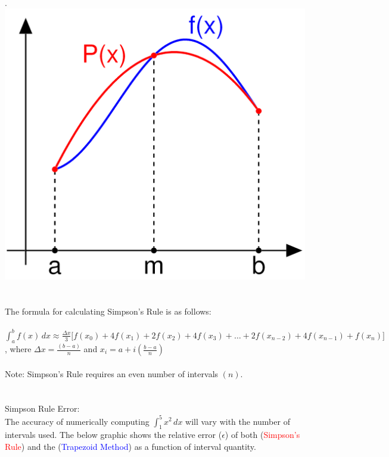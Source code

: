 \documentclass{report}
\begin{document}
\begin{enumerate}
\\. \hspace{30 mm} \includegraphics[scale=.10]{simpson.png}
\\
\\
\\
The formula for calculating Simpson's Rule is as follows:
\\
\\ $\displaystyle \int^b_a f(x)\,dx  \approx  \frac{\Delta x}{3}\Big[f(x_{0})+4f(x_1)+2f(x_2)+4f(x_3)+\ldots+2f(x_{n-2})+4f(x_{n-1})+f(x_n)\Big]$, \hspace{4 mm} where $\displaystyle \Delta x = \frac{(b-a)}{n}$ 
\hspace{7 mm} and \hspace{7 mm} $\displaystyle x_i = a + i(\frac{b-a}{n})$
\\
\\Note: Simpson's Rule requires an even number of intervals $(n)$. 
\\
\\
\\Simpson Rule Error: 
\\
The accuracy of numerically computing $\displaystyle\int^5_1x^2\,dx$ will vary with the number of intervals used. The below graphic shows the relative error ($\epsilon$) of both (\textcolor{red}{Simpson's Rule}) and the (\textcolor{blue}{Trapezoid Method}) as a function of interval quantity.
\\

\end{enumerate}
\end{document}
